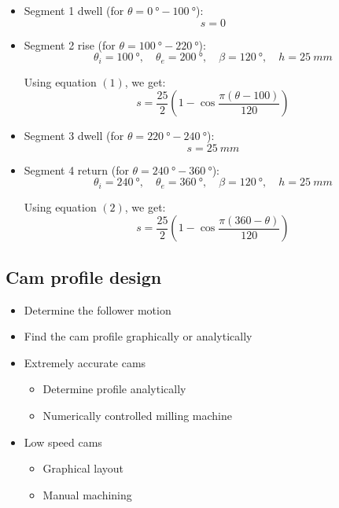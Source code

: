 \documentclass[11pt]{article}
\begin{document}
\begin{itemize}
\item Segment 1 dwell (for \(\theta = \qty{0}{\degree} - \qty{100}{\degree}\)):
\[s = 0\]

\item Segment 2 rise (for \(\theta = \qty{100}{\degree} - \qty{220}{\degree}\)):
\[\theta_i = \qty{100}{\degree}, \quad \theta_e = \qty{200}{\degree}, \quad \beta = \qty{120}{\degree}, \quad h = \qty{25}{mm}\]

Using equation \((1)\), we get:
\[s = \frac{25}{2} \left(1 - \cos \frac{\pi (\theta - 100)}{120} \right)\]

\item Segment 3 dwell (for \(\theta = \qty{220}{\degree} - \qty{240}{\degree}\)):
\[s = \qty{25}{mm}\]

\item Segment 4 return (for \(\theta = \qty{240}{\degree} - \qty{360}{\degree}\)):
\[\theta_i = \qty{240}{\degree}, \quad \theta_e = \qty{360}{\degree}, \quad \beta = \qty{120}{\degree}, \quad h = \qty{25}{mm}\]

Using equation \((2)\), we get:
\[s = \frac{25}{2} \left(1 - \cos \frac{\pi (360 - \theta)}{120} \right)\]
\end{itemize}
\subsection{Cam profile design}
\label{sec:orgee7a649}
\begin{itemize}
\item Determine the follower motion
\item Find the cam profile graphically or analytically
\item Extremely accurate cams
\begin{itemize}
\item Determine profile analytically
\item Numerically controlled milling machine
\end{itemize}
\item Low speed cams
\begin{itemize}
\item Graphical layout
\item Manual machining
\end{itemize}
\end{itemize}
\end{document}
